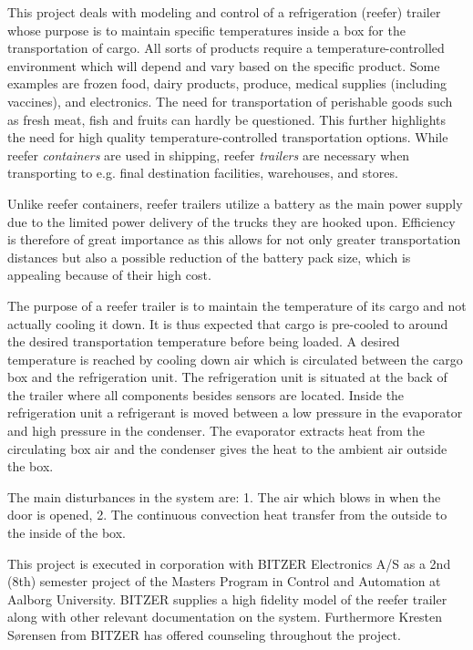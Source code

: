 This project deals with modeling and control of a refrigeration (reefer) trailer whose purpose is to maintain specific temperatures inside a box for the transportation of cargo. All sorts of products require a temperature-controlled environment which will depend and vary based on the specific product. Some examples are frozen food, dairy products, produce, medical supplies (including vaccines), and electronics. The need for transportation of perishable goods such as fresh meat, fish and fruits can hardly be questioned. This further highlights the need for high quality temperature-controlled transportation options. While reefer \textit{containers} are used in shipping, reefer \textit{trailers} are necessary when transporting to e.g. final destination facilities, warehouses, and stores.

Unlike reefer containers, reefer trailers utilize a battery as the main power supply due to the limited power delivery of the trucks they are hooked upon. Efficiency is therefore of great importance as this allows for not only greater transportation distances but also a possible reduction of the battery pack size, which is appealing because of their high cost.

The purpose of a reefer trailer is to maintain the temperature of its cargo and not actually cooling it down. It is thus expected that cargo is pre-cooled to around the desired transportation temperature before being loaded. A desired temperature is reached by cooling down air which is circulated between the cargo box and the refrigeration unit. The refrigeration unit is situated at the back of the trailer where all components besides sensors are located. Inside the refrigeration unit a refrigerant is moved between a low pressure in the evaporator and high pressure in the condenser. The evaporator extracts heat from the circulating box air and the condenser gives the heat to the ambient air outside the box.

The main disturbances in the system are: 1. The air which blows in when the door is opened, 2. The continuous convection heat transfer from the outside to the inside of the box.

This project is executed in corporation with BITZER Electronics A/S as a 2nd (8th) semester project of the Masters Program in Control and Automation at Aalborg University. BITZER supplies a high fidelity model of the reefer trailer along with other relevant documentation on the system. Furthermore Kresten Sørensen from BITZER has offered counseling throughout the project.

